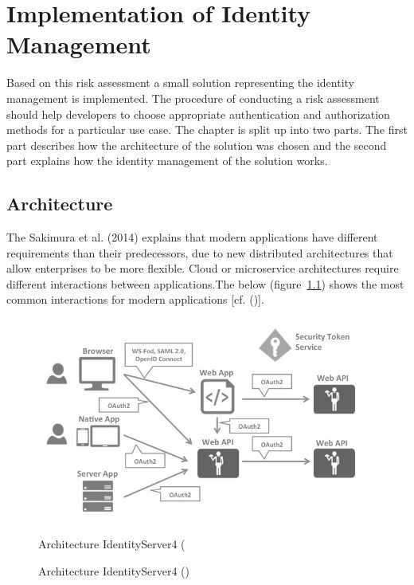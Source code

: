 \chapter{Implementation of Identity Management}\label{chap:implementation}
\chapterstart

 Based on this risk assessment a small solution representing the identity management is implemented. The procedure of conducting a risk assessment should help developers to choose appropriate authentication and authorization methods for a particular use case. The chapter is split up into two parts. The first part describes how the architecture of the solution was chosen and the second part explains how the identity management of the solution works. 


\section{Architecture}
\label{architecture}

The Sakimura et al. (2014) explains that modern applications have different requirements than their predecessors, due to new distributed architectures that allow enterprises to be more flexible. Cloud or microservice architectures require different interactions between applications.The below (figure~\ref{fig:architecture-identityserver}) shows the most common interactions for modern applications [cf. (\cite{Sakimura:2014:OpenIDConnect})].

\begin{figure}[h]
	\centering
	\includegraphics[width=0.9\linewidth]{images/architecture-identityserver}
	\caption[Architecture IdentityServer4]{Architecture IdentityServer4 (\cite{Brock:2018:ID4}}
	\caption{Architecture IdentityServer4 (\cite{Brock:2018:ID4})}
	\label{fig:architecture-identityserver}
\end{figure}

